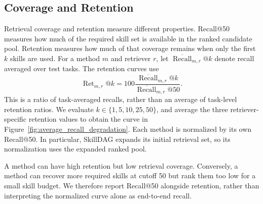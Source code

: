 \subsection{Coverage and Retention}
\label{app:retention-definition}
Retrieval coverage and retention measure different properties. Recall@50 measures how much of the required skill set is available in the ranked candidate pool. Retention measures how much of that coverage remains when only the first $k$ skills are used. For a method $m$ and retriever $r$, let $\overline{\operatorname{Recall}}_{m,r}@k$ denote recall averaged over test tasks. The retention curves use
\[
\operatorname{Ret}_{m,r}@k
=100\frac{\overline{\operatorname{Recall}}_{m,r}@k}
{\overline{\operatorname{Recall}}_{m,r}@50}.
\]
This is a ratio of task-averaged recalls, rather than an average of task-level retention ratios. We evaluate $k\in\{1,5,10,25,50\}$, and average the three retriever-specific retention values to obtain the curve in Figure~\ref{fig:average_recall_degradation}. Each method is normalized by its own Recall@50. In particular, SkillDAG expands its initial retrieval set, so its normalization uses the expanded ranked pool.

A method can have high retention but low retrieval coverage. Conversely, a method can recover more required skills at cutoff 50 but rank them too low for a small skill budget. We therefore report Recall@50 alongside retention, rather than interpreting the normalized curve alone as end-to-end recall.
